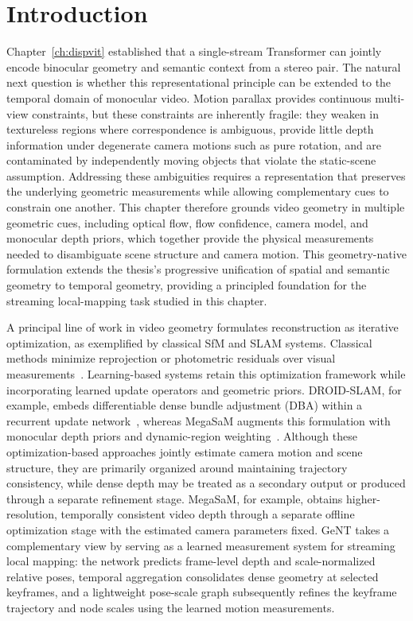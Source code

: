 
\section{Introduction}
Chapter~\ref{ch:dispvit} established that a single-stream Transformer can jointly encode binocular geometry and semantic context from a stereo pair.
The natural next question is whether this representational principle can be extended to the temporal domain of monocular video.
Motion parallax provides continuous multi-view constraints, but these constraints are inherently fragile: they weaken in textureless regions where correspondence is ambiguous, provide little depth information under degenerate camera motions such as pure rotation, and are contaminated by independently moving objects that violate the static-scene assumption.
Addressing these ambiguities requires a representation that preserves the underlying geometric measurements while allowing complementary cues to constrain one another.
This chapter therefore grounds video geometry in multiple geometric cues, including optical flow, flow confidence, camera model, and monocular depth priors, which together provide the physical measurements needed to disambiguate scene structure and camera motion.
This geometry-native formulation extends the thesis's progressive unification of spatial and semantic geometry to temporal geometry, providing a principled foundation for the streaming local-mapping task studied in this chapter.

A principal line of work in video geometry formulates reconstruction as iterative optimization, as exemplified by classical SfM and SLAM systems.
Classical methods minimize reprojection or photometric residuals over visual measurements~\cite{schoenberger2016sfm,murAcceptedTRO2015}.
Learning-based systems retain this optimization framework while incorporating learned update operators and geometric priors.
DROID-SLAM, for example, embeds differentiable dense bundle adjustment (DBA) within a recurrent update network~\cite{teed2021droid}, whereas MegaSaM augments this formulation with monocular depth priors and dynamic-region weighting~\cite{li2025megasam}.
Although these optimization-based approaches jointly estimate camera motion and scene structure, they are primarily organized around maintaining trajectory consistency, while dense depth may be treated as a secondary output or produced through a separate refinement stage.
MegaSaM, for example, obtains higher-resolution, temporally consistent video depth through a separate offline optimization stage with the estimated camera parameters fixed.
GeNT takes a complementary view by serving as a learned measurement system for streaming local mapping: the network predicts frame-level depth and scale-normalized relative poses, temporal aggregation consolidates dense geometry at selected keyframes, and a lightweight pose-scale graph subsequently refines the keyframe trajectory and node scales using the learned motion measurements.

